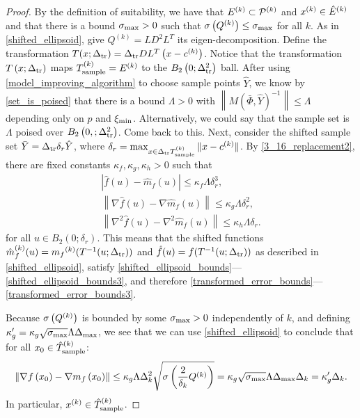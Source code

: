 \documentclass{article}
\begin{document}
\begin{proof}
By the definition of suitability, we have that ${E^{(k)}} \subset {{\mathcal{P}}^{(k)}}$ and $x^{(k)} \in {{\hat E}^{(k)}}$ and that there is a bound $\sigma_{\textrm{max}} > 0$ such that ${\sigma}\left(Q^{(k)}\right)\le \sigma_{\textrm{max}}$ for all $k$.
As in \cref{shifted_ellipsoid},  give $Q^{(k)} = LD^2L^T$ its eigen-decomposition.
Define the transformation $T(x; \Delta_{\textrm{tr}}) = \Delta_{\textrm{tr}} D L^T\left(x - c^{(k)}\right)$.  
Notice that
the transformation $T\left(x; \Delta_{\textrm{tr}}\right)$ maps ${T_{\text{sample}}^{(k)}} = {E^{(k)}}$ to the $B_2\left(0; \Delta_{\textrm{tr}}^2\right)$ ball.  
After using \cref{model_improving_algorithm} to choose sample points $\hat Y$, we know by \cref{set_is_poised}
that there is a bound $\Lambda>0$ with $\left\| M\left(\bar \Phi, \hat Y\right)^{-1}\right\| \le \Lambda$ depending only on $p$ and $\xi_{\text{min}}$.
\color{magenta}
Alternatively, we could say that the sample set is $\Lambda$ poised over $B_2\left(0,; \Delta_{\textrm{tr}}^2\right)$.
Come back to this.
\color{black}
Next,  consider the shifted sample set $\bar Y = \Delta_{\textrm{tr}} \delta_r \hat Y$,     where $\delta_r = \max_{x \in \Delta_{\textrm{tr}} {T_{\text{sample}}^{(k)}}}\|x - c^{(k)}\|$.
By \cref{3_16_replacement2},  there are fixed constants $\kappa_f, \kappa_g, \kappa_h > 0$ such that
\begin{align*}
\left| \hat {f}\left(u\right) - \hat{m}_f\left(u\right) \right|\le \kappa_f\Lambda \delta_r^3, \\
\left\|\nabla \hat {f}\left(u\right) - \nabla \hat{m}_f\left(u\right) \right\|\le \kappa_g\Lambda \delta_r^2, \\
\left\|\nabla^2 \hat {f}\left(u\right) - \nabla^2 \hat{m}_f\left(u\right) \right\|\le \kappa_h\Lambda \delta_r.
\end{align*}
for all $u \in B_2\left(0; \delta_r\right)$.
This means that the shifted functions
$\hat {m}_f^{(k)}(u) = {{m}_f}^{(k)}(T^{-1}(u; \Delta_{\textrm{tr}}))$ and
$\hat f (u) = f(T^{-1}(u; \Delta_{\textrm{tr}}))$
as described in \cref{shifted_ellipsoid},
satisfy \cref{shifted_ellipsoid_bounds}---\cref{shifted_ellipsoid_bounds3},
and therefore \cref{transformed_error_bounds}---\cref{transformed_error_bounds3}.


Because ${\sigma} \left({Q^{(k)}}\right)$ is bounded by some $\sigma_{\textrm{max}} > 0$ independently of $k$,
and defining $\kappa'_{g} =  \kappa_g\sqrt{\sigma_{\textrm{max}}}\Lambda{\Delta_{\textrm{max}}}$, we see that
we can use  \cref{shifted_ellipsoid} to conclude that for all $x_0 \in  {\hat{T}_{\text{sample}}^{(k)}}$:
\begin{align*}
\left\|\nabla f\left(x_0 \right) - \nabla m_f\left(x_0\right)\right\| \le 
\kappa_g  \Lambda\Delta_k^2 \sqrt{{\sigma} \left(\frac 2 {\delta_k} Q^{(k)}\right)}
=  \kappa_g \sqrt{\sigma_{\textrm{max}}}\Lambda{\Delta_{\textrm{max}}}\Delta_k
= \kappa'_g\Delta_k.
\end{align*}
In particular, $x^{(k)} \in {\hat{T}_{\text{sample}}^{(k)}}$.
\end{proof}
\end{document}
